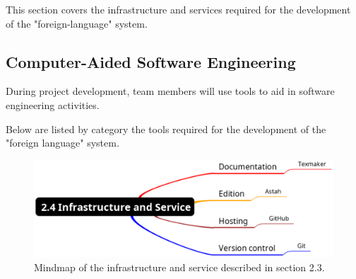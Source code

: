 \documentclass[11pt, twoside, a4paper]{book}
\begin{document}
				This section covers the infrastructure and services required for the development of the "foreign-language" system.
				
				\subsection{Computer-Aided Software Engineering}
					
					During project development, team members will use tools to aid in software engineering activities.
					
					Below are listed by category the tools required for the development of the "foreign language" system.

				\begin{figure}[!ht]
					\centering
  					\includegraphics[scale=0.4]{2-4_Infrastructure_and_Service.eps}
					\caption{Mindmap of the infrastructure and service described in section 2.3.}
				\end{figure}  

\end{document}
